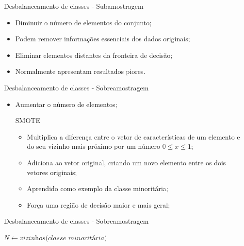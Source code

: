 \documentclass{beamer}
\begin{document}
\begin{frame}{Desbalanceamento de classes - Subamostragem}
\setlength\leftmargini{0em}
\justifying
    \begin{itemize}
        \item Diminuir o número de elementos do conjunto;
        \item Podem remover informações essenciais dos dados originais;
        \item Eliminar elementos distantes da fronteira de decisão;
        \item Normalmente apresentam resultados piores.
    \end{itemize}
\end{frame}
\begin{frame}{Desbalanceamento de classes - Sobreamostragem}
\setlength\leftmargini{0em}
\justifying
    \begin{itemize}
        \item Aumentar o número de elementos;
    \begin{block}{SMOTE}
\setlength\leftmargini{1em}
        \begin{itemize}
            \item Multiplica a diferença entre o vetor de características de um elemento e do seu vizinho mais próximo por um número $0 \leq x \leq 1$;
            \item Adiciona ao vetor original, criando um novo elemento entre os dois vetores originais;
            \item Aprendido como exemplo da classe minoritária;
            \item Força uma região de decisão maior e mais geral;
        \end{itemize}
    \end{block}
    \end{itemize}
\end{frame}
\begin{frame}{Desbalanceamento de classes - Sobreamostragem}
\setlength\leftmargini{0em}
\justifying
  \begin{algorithm}[H]
    \caption{SMOTE: método para rebalancear classes}
    \SetAlgoLined
    $N \gets \textit{vizinhos(classe minoritária)}$\;
  \end{algorithm}
\end{frame}
\end{document}
